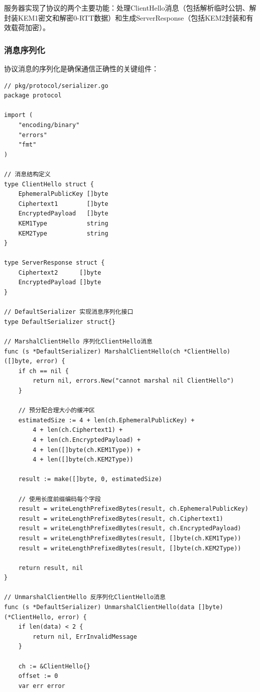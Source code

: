 服务器实现了协议的两个主要功能：处理ClientHello消息（包括解析临时公钥、解封装KEM1密文和解密0-RTT数据）和生成ServerResponse（包括KEM2封装和有效载荷加密）。

\subsubsection{消息序列化}

协议消息的序列化是确保通信正确性的关键组件：

\begin{verbatim}
// pkg/protocol/serializer.go
package protocol

import (
    "encoding/binary"
    "errors"
    "fmt"
)

// 消息结构定义
type ClientHello struct {
    EphemeralPublicKey []byte
    Ciphertext1        []byte
    EncryptedPayload   []byte
    KEM1Type           string
    KEM2Type           string
}

type ServerResponse struct {
    Ciphertext2      []byte
    EncryptedPayload []byte
}

// DefaultSerializer 实现消息序列化接口
type DefaultSerializer struct{}

// MarshalClientHello 序列化ClientHello消息
func (s *DefaultSerializer) MarshalClientHello(ch *ClientHello) ([]byte, error) {
    if ch == nil {
        return nil, errors.New("cannot marshal nil ClientHello")
    }

    // 预分配合理大小的缓冲区
    estimatedSize := 4 + len(ch.EphemeralPublicKey) +
        4 + len(ch.Ciphertext1) +
        4 + len(ch.EncryptedPayload) +
        4 + len([]byte(ch.KEM1Type)) +
        4 + len([]byte(ch.KEM2Type))

    result := make([]byte, 0, estimatedSize)

    // 使用长度前缀编码每个字段
    result = writeLengthPrefixedBytes(result, ch.EphemeralPublicKey)
    result = writeLengthPrefixedBytes(result, ch.Ciphertext1)
    result = writeLengthPrefixedBytes(result, ch.EncryptedPayload)
    result = writeLengthPrefixedBytes(result, []byte(ch.KEM1Type))
    result = writeLengthPrefixedBytes(result, []byte(ch.KEM2Type))

    return result, nil
}

// UnmarshalClientHello 反序列化ClientHello消息
func (s *DefaultSerializer) UnmarshalClientHello(data []byte) (*ClientHello, error) {
    if len(data) < 2 {
        return nil, ErrInvalidMessage
    }

    ch := &ClientHello{}
    offset := 0
    var err error


\end{verbatim}
